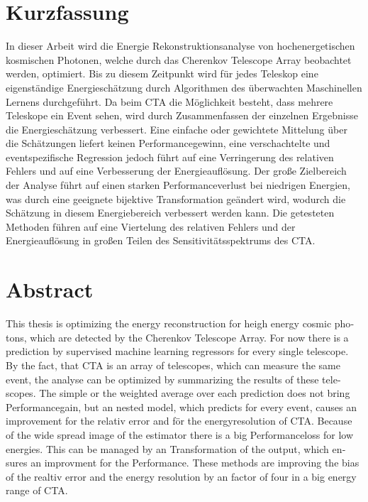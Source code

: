 \thispagestyle{plain}

\section*{Kurzfassung}
In dieser Arbeit wird die Energie Rekonstruktionsanalyse von hochenergetischen kosmischen Photonen, welche durch das Cherenkov Telescope Array beobachtet
werden, optimiert.
Bis zu diesem Zeitpunkt wird für jedes Teleskop eine eigenständige Energieschätzung durch Algorithmen des überwachten Maschinellen Lernens durchgeführt.
Da beim CTA die Möglichkeit besteht, dass mehrere Teleskope ein Event sehen, wird durch Zusammenfassen der einzelnen Ergebnisse die
Energieschätzung verbessert.
Eine einfache oder gewichtete Mittelung über die Schätzungen liefert keinen Performancegewinn, eine verschachtelte und eventspezifische Regression jedoch
führt auf eine Verringerung des relativen Fehlers und auf eine Verbesserung der Energieauflösung.
Der große Zielbereich der Analyse führt auf einen starken Performanceverlust bei niedrigen Energien, was durch eine geeignete bijektive Transformation
geändert wird, wodurch die Schätzung in diesem Energiebereich verbessert werden kann.
Die getesteten Methoden führen auf eine Viertelung des relativen Fehlers und der Energieauflösung in großen Teilen des Sensitivitätsspektrums des CTA.

\section*{Abstract}
\begin{english}
This thesis is optimizing the energy reconstruction for heigh energy cosmic photons, which are detected by the Cherenkov Telescope Array.
For now there is a prediction by supervised machine learning regressors for every single telescope.
By the fact, that CTA is an array of telescopes, which can measure the same event, the analyse can be optimized by summarizing the results of these telescopes.
The simple or the weighted average over each prediction does not bring Performancegain, but an nested model, which predicts for every event, causes an improvement
for the relativ error and för the energyresolution of CTA.
Because of the wide spread image of the estimator there is a big Performanceloss for low energies.
This can be managed by an Transformation of the output, which ensures an improvment for the Performance.
These methods are improving the bias of the realtiv error and the energy resolution by an factor of four in a big energy range of CTA.
\end{english}
